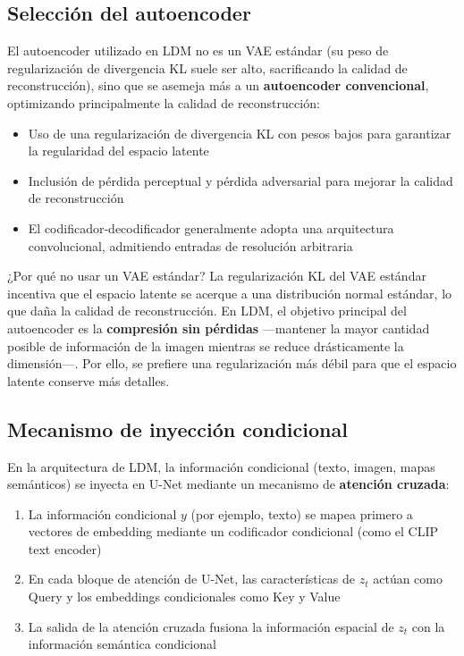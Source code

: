 \documentclass[a4paper]{article}
\begin{document}
\subsection{Selección del autoencoder}

El autoencoder utilizado en LDM no es un VAE estándar (su peso de regularización de divergencia KL suele ser alto, sacrificando la calidad de reconstrucción), sino que se asemeja más a un \textbf{autoencoder convencional}, optimizando principalmente la calidad de reconstrucción:

\begin{itemize}
    \item Uso de una regularización de divergencia KL con pesos bajos para garantizar la regularidad del espacio latente
    \item Inclusión de pérdida perceptual y pérdida adversarial para mejorar la calidad de reconstrucción
    \item El codificador-decodificador generalmente adopta una arquitectura convolucional, admitiendo entradas de resolución arbitraria
\end{itemize}

\begin{knowledgebox}{¿Por qué no usar un VAE estándar?}
La regularización KL del VAE estándar incentiva que el espacio latente se acerque a una distribución normal estándar, lo que daña la calidad de reconstrucción. En LDM, el objetivo principal del autoencoder es la \textbf{compresión sin pérdidas} —mantener la mayor cantidad posible de información de la imagen mientras se reduce drásticamente la dimensión—. Por ello, se prefiere una regularización más débil para que el espacio latente conserve más detalles.
\end{knowledgebox}

\subsection{Mecanismo de inyección condicional}

En la arquitectura de LDM, la información condicional (texto, imagen, mapas semánticos) se inyecta en U-Net mediante un mecanismo de \textbf{atención cruzada}:

\begin{enumerate}
    \item La información condicional $y$ (por ejemplo, texto) se mapea primero a vectores de embedding mediante un codificador condicional (como el CLIP text encoder)
    \item En cada bloque de atención de U-Net, las características de $z_t$ actúan como Query y los embeddings condicionales como Key y Value
    \item La salida de la atención cruzada fusiona la información espacial de $z_t$ con la información semántica condicional
\end{enumerate}
\end{document}
